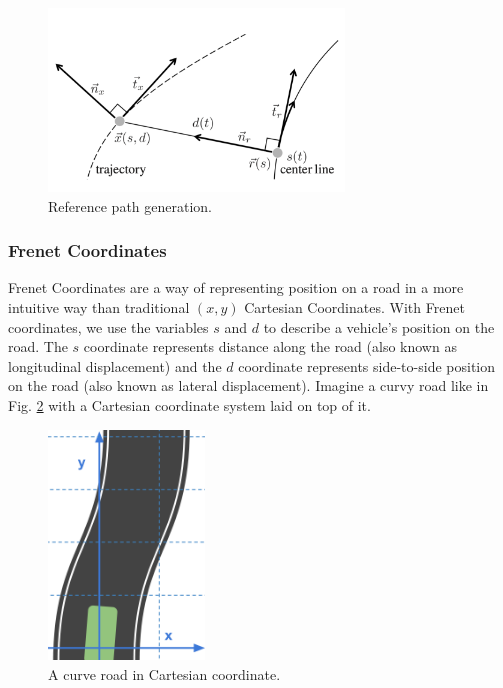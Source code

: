 \begin{figure}[h]
\centering
\includegraphics[width=0.7\textwidth]{figs/ch3/traj-generation}
\caption{Reference path generation.}
\label{fig:traj-generation}
\end{figure}

\subsubsection{Frenet Coordinates}


Frenet Coordinates are a way of representing position on a road in a more intuitive way than traditional $(x,y)$ Cartesian Coordinates. With Frenet coordinates, we use the variables $s$ and $d$ to describe a vehicle's position on the road. The $s$ coordinate represents distance along the road (also known as longitudinal displacement) and the $d$ coordinate represents side-to-side position on the road (also known as lateral displacement). Imagine a curvy road like in Fig. \ref{fig:curve-in-cartesian} with a Cartesian coordinate system laid on top of it.

\begin{figure}[h]
\centering
\includegraphics[height=2.4in]{figs/ch3/curve-in-cartesian}
\caption{A curve road in Cartesian coordinate.}
\label{fig:curve-in-cartesian}
\end{figure}

